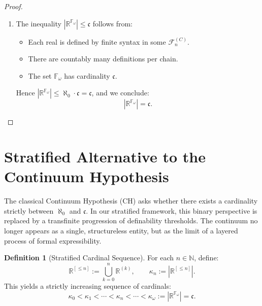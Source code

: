 \documentclass[12pt]{article}
\theoremstyle{definition}
\newtheorem{definition}{Definition}[section]
\theoremstyle{plain}
\theoremstyle{remark}
\begin{document}
\begin{proof}
\begin{enumerate}
\item The inequality \( |\mathbb{R}^{\mathbb{F}_\omega}| \leq \mathfrak{c} \) follows from:
\begin{itemize}
    \item Each real is defined by finite syntax in some \( \mathcal{F}_n^{(C)} \).
    \item There are countably many definitions per chain.
    \item The set \( \mathbb{F}_\omega \) has cardinality \( \mathfrak{c} \).
\end{itemize}
Hence \( |\mathbb{R}^{\mathbb{F}_\omega}| \leq \aleph_0 \cdot \mathfrak{c} = \mathfrak{c} \), and we conclude:
\[
|\mathbb{R}^{\mathbb{F}_\omega}| = \mathfrak{c}.
\]
\end{enumerate}
\end{proof}

\section{Stratified Alternative to the Continuum Hypothesis}

The classical Continuum Hypothesis (CH) asks whether there exists a cardinality strictly between \( \aleph_0 \) and \( \mathfrak{c} \). In our stratified framework, this binary perspective is replaced by a transfinite progression of definability thresholds. The continuum no longer appears as a single, structureless entity, but as the limit of a layered process of formal expressibility.

\begin{definition}[Stratified Cardinal Sequence]
For each \( n \in \mathbb{N} \), define:
\[
    \mathbb{R}^{[\leq n]} := \bigcup_{k = 0}^{n} \mathbb{R}^{(k)}, \qquad
    \kappa_n := \left| \mathbb{R}^{[\leq n]} \right|.
\]
This yields a strictly increasing sequence of cardinals:
\[
    \kappa_0 < \kappa_1 < \cdots < \kappa_n < \cdots < \kappa_\omega := \left| \mathbb{R}^{\mathbb{F}_\omega} \right| = \mathfrak{c}.
\]
\end{definition}
\end{document}
